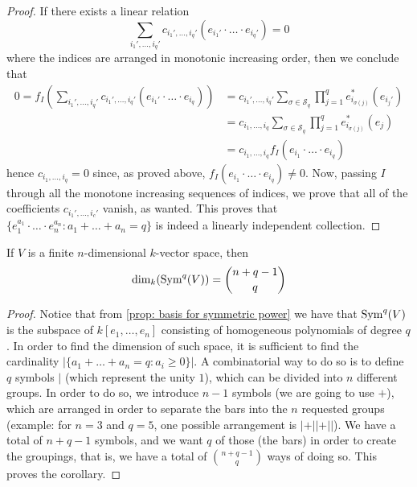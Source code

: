 \begin{proof}
  If there exists a linear relation
  \[
    \sum_{i_1', \dots, i_q'} c_{i_1', \dots, i_q'} (e_{i_1'} \cdot \ldots \cdot
    e_{i_q'}) = 0
  \]
  where the indices are arranged in monotonic increasing order, then we conclude
  that
  \begin{align*}
    0 = f_I \left( \sum_{i_1', \dots, i_q'} c_{i_1', \dots, i_q'} (e_{i_1'} \cdot
    \ldots \cdot e_{i_q}) \right)
    &= c_{i_1', \dots, i_q'} \sum_{\sigma \in \mathcal S_q} \prod_{j=1}^q
    e_{i_{\sigma(j)}}^*(e_{i_j'}) \\
    &= c_{i_1, \dots, i_q} \sum_{\sigma \in \mathcal S_q} \prod_{j=1}^q
    e_{i_{\sigma(j)}}^*(e_j) \\
    &=  c_{i_1, \dots, i_q} f_I(e_{i_1} \cdot \ldots \cdot e_{i_q})
  \end{align*}
  hence \(c_{i_1, \dots, i_q} = 0\) since, as proved above, \(f_I(e_{i_1} \cdot
  \ldots \cdot e_{i_q}) \neq 0\). Now, passing \(I\) through all the monotone
  increasing sequences of indices, we prove that all of the coefficients
  \(c_{i_1', \dots, i_c'}\) vanish, as wanted. This proves that \(\{e_1^{a_1}
  \cdot \ldots \cdot e_n^{a_n} : a_1 + \dots + a_n = q\}\) is indeed a linearly
  independent collection.
\end{proof}

\begin{corollary}
  If \(V\) is a finite \(n\)-dimensional \(k\)-vector space, then
  \[
    \dim_k(\operatorname{Sym}^q(V)) = \binom{n + q - 1}{q}
  \]
\end{corollary}

\begin{proof}
  Notice that from \cref{prop: basis for symmetric power} we have that
  \(\operatorname{Sym}^q(V)\) is the subspace of \(k[e_1, \dots, e_n]\) consisting of
  homogeneous polynomials of degree \(q\). In order to find the dimension of
  such space, it is sufficient to find the cardinality \(|\{a_1 + \dots + a_n =
  q : a_i \geq 0\}|\). A combinatorial way to do so is to define \(q\)
  symbols \(|\) (which represent the unity \(1\)), which can be divided into
  \(n\) different groups. In order to do so, we introduce \(n - 1\) symbols (we
  are going to use \(+\)), which are arranged in order to separate the bars into
  the \(n\) requested groups (example: for \(n = 3\) and \(q = 5\), one possible
  arrangement is \(| + || + ||\)). We have a total of \(n + q - 1\) symbols, and
  we want \(q\) of those (the bars) in order to create the groupings, that
  is, we have a total of \(\binom{n + q - 1}{q}\) ways of doing so. This proves
  the corollary.
\end{proof}

